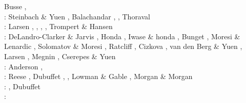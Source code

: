 \begin{scriptsize}
                     Busse \etal \cite{bucc94},
                     \cite{chho94}\cite{tasg94}\cite{itki94}\cite{leka94}\cite{scha94}\\
\nineteenninetyfive: Steinbach \& Yuen \cite{styu95}, Balachandar \etal \cite{bayr95,bayr95b}, 
                     \cite{zhgu95}
                     \cite{vayv95}\cite{buba95}\cite{rasz95}\cite{berc95}\cite{puhj95}\cite{pujh95}
      \cite{solo95}\cite{vayu95}\cite{matb95}, Thoraval \etal \cite{thmc95}\\
\nineteenninetysix: Larsen \etal \cite{laym96}, \cite{zhyu96},
                    \cite{hond96}\cite{rytr96a}
                    \cite{rytr96b}\cite{tack96}
                    \cite{trbo96}, \cite{birg96}
                    \cite{burb96}\cite{kafo96}
                    \cite{guez96}\cite{vayu96}
                    \cite{rasz96}\cite{rasz96b}
                    \cite{leka96}\cite{iwas96}
                    \cite{buri96}\cite{schh96}, Trompert \& Hansen \cite{trha96}\\
\nineteenninetyseven: DeLandro-Clarker \& Jarvis \cite{deja97}, Honda \cite{hond97}, 
                      Iwase \& honda \cite{iwho97}, Bunget \etal \cite{burb97},
                      Moresi \& Lenardic \cite{mole97}, Solomatov \& Moresi \cite{somo97},
                      Ratcliff \etal \cite{rats97}, Cizkova \etal \cite{cicv97},
                      van den Berg \& Yuen \cite{vayu97}, Larsen \etal \cite{laym97},
                      Megnin \etal \cite{mebr97}, Cserepes \& Yuen \cite{csyu97}\\
\nineteenninetyeight: Anderson \cite{ande98}, \cite{iwho98}\cite{devv98}\cite{tack98}\cite{tack98b}\cite{trha98b}
      \cite{trha98}\cite{burl98}\cite{mokm98}\cite{lena98}\cite{vayu98}\cite{wema98}\\
\nineteenninetynine: Reese \etal \cite{resb99}, Dubuffet \etal \cite{duyr99}, 
                     \cite{vazh99}\cite{dava99}
                     \cite{tabg99}\cite{como99}
                     \cite{cicv99}\cite{trrj99},
                     Lowman \& Gable \cite{loga99}, Morgan \& Morgan \cite{momo99}\\ 
\twothousand: \cite{albe00}\cite{hayu00}
              \cite{devv00b}\cite{tack00}
              \cite{tack00b}\cite{tack00c}
              \cite{tack00d}\cite{zhzm00}
              \cite{legm00}\cite{conr00}
              \cite{somo00},  Dubuffet \etal \cite{duyu00,duyy00}\\
\twothousandone: \cite{vank01}\cite{riyb01}
                 \cite{lemo01}\cite{vays01}
                 \cite{moqu01}\cite{zhon01}

\end{scriptsize}
